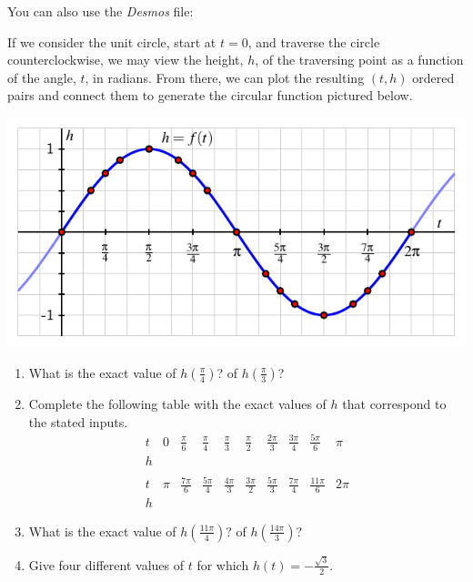 \documentclass[nooutcomes]{ximera}
\begin{document}
You can also use the \emph{Desmos} file:

\begin{center}  
\end{center}

\begin{exploration}

If we consider the unit circle, start at \(t = 0\), and traverse the circle counterclockwise, we may view the height, \(h\), of the traversing point as a function of the angle, \(t\), in radians.  From there, we can plot the resulting \((t,h)\) ordered pairs and connect them to generate the circular function pictured below.

\begin{image}
\includegraphics{sine-labeling-graph.pdf}
\end{image}

\begin{enumerate}[label=\alph*.]
\item
What is the exact value of \(h\left( \frac{\pi}{4} \right)\)? of \(h\left( \frac{\pi}{3} \right)\)?%
\item
Complete the following table with the exact values of \(h\) that correspond to the stated inputs.%
\[
\begin{array}{llllllllll}
t&0&\frac{\pi}{6}&\frac{\pi}{4}&\frac{\pi}{3}&\frac{\pi}{2}&\frac{2\pi}{3}&\frac{3\pi}{4}&\frac{5\pi}{6}&\pi\\
\hline
h&&&&&&&&&\\
&&&&&&&&&\\
t&\pi&\frac{7\pi}{6}&\frac{5\pi}{4}&\frac{4\pi}{3}&\frac{3\pi}{2}&\frac{5\pi}{3}&\frac{7\pi}{4}&\frac{11\pi}{6}&2\pi\\
\hline
h&&&&&&&&&
\end{array}
\]
\item
What is the exact value of \(h\left( \frac{11\pi}{4} \right)\)? of \(h\left( \frac{14\pi}{3} \right)\)?%
\item
Give four different values of \(t\) for which \(h(t) = -\frac{\sqrt{3}}{2}\).%
\end{enumerate}

\end{exploration}
\end{document}
